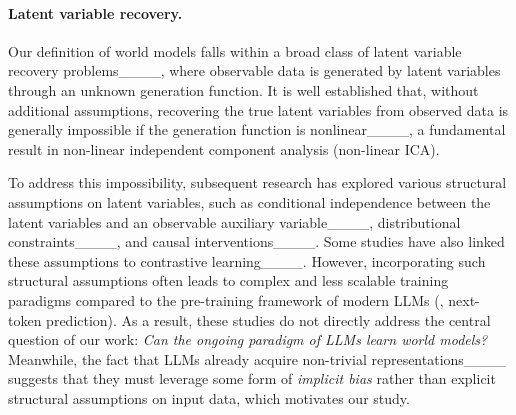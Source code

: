 
\paragraph{Latent variable recovery.} Our definition of world models falls within a broad class of latent variable recovery problems____, where observable data is generated by latent variables through an unknown generation function. It is well established that, without additional assumptions, recovering the true latent variables from observed data is generally impossible if the generation function is nonlinear____, a fundamental result in non-linear independent component analysis (non-linear ICA).

To address this impossibility, subsequent research has explored various structural assumptions on latent variables, such as conditional independence between the latent variables and an observable auxiliary variable____, distributional constraints____, and causal interventions____. Some studies have also linked these assumptions to contrastive learning____. However, incorporating such structural assumptions often leads to complex and less scalable training paradigms compared to the pre-training framework of modern LLMs (\ie, next-token prediction). As a result, these studies do not directly address the central question of our work: \emph{Can the ongoing paradigm of LLMs learn world models?} Meanwhile, the fact that LLMs already acquire non-trivial representations____ suggests that they must leverage some form of \emph{implicit bias} rather than explicit structural assumptions on input data, which motivates our study.

